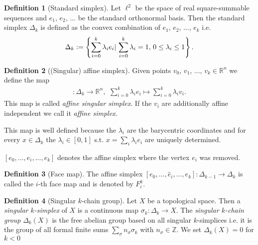 \documentclass[12pt,a4paper]{article}
\theoremstyle{definition}
\newtheorem{definition}{Definition}
\newcommand{\real}{\mathbb{R}}
\begin{document}
\begin{definition}[Standard simplex]
    Let $\ell^2$ be the space of real square-summable sequences and 
    $e_1$, $e_2$, ... be the standard orthonormal basis. Then the 
    standard simplex
    $\Delta_k$ is defined as the convex combination of $e_1$, $e_2$, ..., $e_k$
    i.e.
    \begin{align*}
        \Delta_k \vcentcolon= \left\{ \sum\limits_{i=0}^k \lambda_i e_i | \,
        \sum\limits_{i=0}^k \lambda_i = 1,\, 0 \leq \lambda_i \leq 1 \right\}.
    \end{align*}
\end{definition}

\begin{definition}[(Singular) affine simplex]
    Given points $v_0$, $v_1$, ..., $v_k \in \real^n$ we define the map 
    \begin{align*}
        [v_0,...,v_k]: \Delta_k \rightarrow \real^n,\, \
        \sum\limits_{i=0}^k \lambda_i e_i \mapsto 
        \sum\limits_{i=0}^k \lambda_i v_i.
    \end{align*}
    This map is called \textit{affine singular simplex}. If the 
    $v_i$ are additionally affine independent we call it 
    \textit{affine simplex}.
\end{definition}
\noindent This map is well defined because the $\lambda_i$ are the barycentric
coordinates and for every $x \in \Delta_k$ the $\lambda_i \in [0,1]$ 
s.t. $x = \sum_i \lambda_i e_i$ are uniquely determined.

$[e_0,...,\hat{e}_i,...,e_k]$ denotes the affine simplex where the vertex $e_i$
was removed. 
\begin{definition}[Face map]
    The affine simplex $[e_0,...,\hat{e}_i,...,e_k]: \Delta_{k-1} \rightarrow 
    \Delta_k$ is called the $i$-th face map and is denoted by $F_i^k$.
\end{definition}


\begin{definition}[Singular $k$-chain group]
    Let $X$ be a topological space. Then a \textit{singular $k$-simplex} of $X$
    is a continuous map $\sigma_k: \Delta_k \rightarrow X$. 
    The \textit{singular $k$-chain group} $\Delta_k(X)$ is the free abelian
    group based on all singular $k$-simplices i.e. it is the group of all 
    formal finite sums $\sum_\sigma n_\sigma \sigma_k$ with $n_\sigma \in 
    \mathbb{Z}$. We set $\Delta_k(X) = 0$ for $k<0$
\end{definition}
\end{document}
